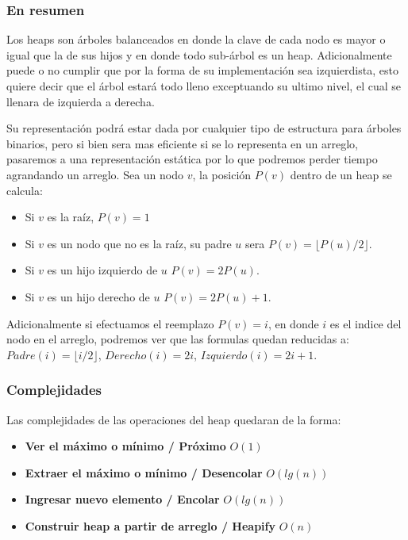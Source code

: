 
\subsubsection{En resumen}

Los heaps son \'arboles balanceados en donde la clave de cada nodo es mayor o igual que la de sus hijos y en donde todo sub-\'arbol es un heap. Adicionalmente puede o no cumplir que por la forma de su implementaci\'on sea izquierdista, esto quiere decir que el \'arbol estar\'a todo lleno exceptuando su ultimo nivel, el cual se llenara de izquierda a derecha.

Su representaci\'on podr\'a estar dada por cualquier tipo de estructura para \'arboles binarios, pero si bien sera mas eficiente si se lo representa en un arreglo, pasaremos a una representaci\'on est\'atica por lo que podremos perder tiempo agrandando un arreglo. Sea un nodo $v$, la posici\'on $P(v)$ dentro de un heap se calcula:

\begin{itemize}
 \item Si $v$ es la ra\'iz, $P(v) = 1$
 \item Si $v$ es un nodo que no es la ra\'iz, su padre $u$ sera $P(v) = \lfloor P(u)/2\rfloor$.
 \item Si $v$ es un hijo izquierdo de $u$ $P(v) = 2P(u)$.
 \item Si $v$ es un hijo derecho de $u$ $P(v) = 2P(u)+1$.
\end{itemize}

Adicionalmente si efectuamos el reemplazo $P(v) = i$, en donde $i$ es el indice del nodo en el arreglo, podremos ver que las formulas quedan reducidas a:  $Padre(i) = \lfloor i/2\rfloor$, $Derecho(i) = 2i$, $Izquierdo(i) = 2i+1$.

\subsubsection{Complejidades}
Las complejidades de las operaciones del heap quedaran de la forma:

\begin{itemize}
 \item \textbf{Ver el m\'aximo o m\'inimo / Pr\'oximo} $O(1)$
 \item \textbf{Extraer el m\'aximo o m\'inimo / Desencolar} $O(lg(n))$
 \item \textbf{Ingresar nuevo elemento / Encolar} $O(lg(n))$
 \item \textbf{Construir heap a partir de arreglo / Heapify} $O(n)$
\end{itemize}

